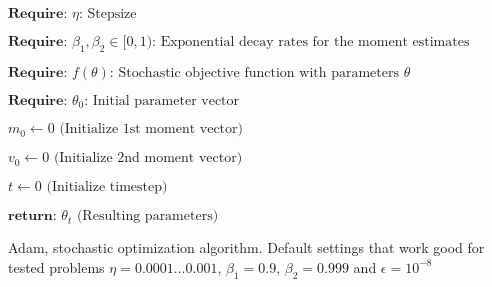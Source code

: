 
\begin{algorithm}[H]

	$\textbf{Require: } \eta\text{: Stepsize}$

	$\textbf{Require: } \beta_1, \beta_2 \in [0, 1) \text{: Exponential decay rates for the moment estimates}$

	$\textbf{Require: } f(\theta) \text{: Stochastic objective function with parameters } \theta$

	$\textbf{Require: } \theta_0 \text{: Initial parameter vector}$

	$m_0 \gets 0 \text{ (Initialize 1st moment vector)}$

	$v_0 \gets 0 \text{ (Initialize 2nd moment vector)}$

	$t \gets 0 \text{ (Initialize timestep)}$

	$\textbf{return: } \theta_t \text{ (Resulting parameters)}$

	\caption{Adam, stochastic optimization algorithm. Default settings that work good for tested problems $\eta=0.0001 \ldots 0.001$, $\beta_1=0.9$, $\beta_2=0.999$ and $\epsilon=10^{-8}$} \label{alg:adam}

\end{algorithm}
